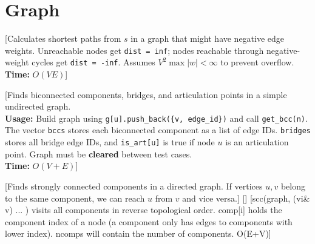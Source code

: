 \chapter{Graph}


[Calculates shortest paths from $s$ in a graph that might have negative edge weights. Unreachable nodes get \texttt{dist = inf}; nodes reachable through negative-weight cycles get \texttt{dist = -inf}. Assumes $V^2 \max |w| < \infty$ to prevent overflow. \\
\textbf{Time:} {$O(VE)$}]


[Finds biconnected components, bridges, and articulation points in a simple undirected graph. \\
\textbf{Usage:} Build graph using \texttt{g[u].push\_back(\{v, edge\_id\})} and call \texttt{get\_bcc(n)}.
The vector \texttt{bccs} stores each biconnected component as a list of edge IDs.
\texttt{bridges} stores all bridge edge IDs, and \texttt{is\_art[u]} is true if node $u$ is an articulation point.
Graph must be \textbf{cleared} between test cases. \\
\textbf{Time:} {$O(V + E)$}]



[Finds strongly connected components in a directed graph. 
If vertices $u, v$ belong to the same component, 
we can reach $u$ from $v$ and vice versa.]
[]
[scc(graph, (vi& v) { ... }) visits all components
 in reverse topological order. comp[i] holds the component
 index of a node (a component only has edges to components with
 lower index). ncomps will contain the number of components. O(E+V)]




